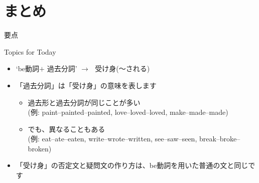 \documentclass[aspectratio=169,xcolor={dvipsnames,table}]{beamer}
\begin{document}
\section{まとめ}
\begin{frame}[plain]{要点}
 
\begin{exampleblock}{Topics for Today}
\begin{itemize}[square]\small
 \item `be動詞$+$ 過去分詞' $\longrightarrow$\,\,\,\,受け身(〜される)
 \item 「過去分詞」は「受け身」の意味を表します
        \begin{itemize}
	 \item 過去形と過去分詞が同じことが多い\\
\mbox{}\hfill{}(例: paint--painted--painted, love--loved--loved, make--made--made)
	 \item でも、異なることもある\\
\mbox{}\hfill{}(例: eat--ate--eaten, write--wrote--written, see--saw--seen, break--broke--broken)
	\end{itemize}
 \item 「受け身」の否定文と疑問文の作り方は、be動詞を用いた普通の文と同じです
\end{itemize}
     \end{exampleblock}
\end{frame}
\end{document}
